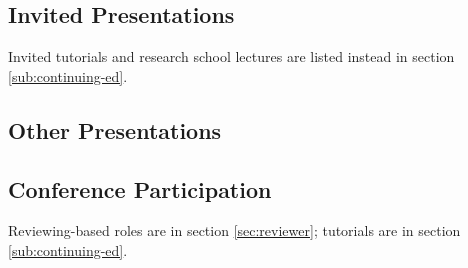 \documentclass[10pt]{article}
\begin{document}
%

\subsection{Invited Presentations} %

Invited tutorials and research school lectures are listed instead in section \ref{sub:continuing-ed}.
{\color{white} \competitive\international\national\local\virtual\paid}

\begin{itemize}[leftmargin=5em]

\end{itemize}


\subsection{Other Presentations}

\begin{itemize}[leftmargin=5em]

\end{itemize}


%

\subsection{Conference Participation} %
\label{sec:conference-participation}

Reviewing-based roles are in section \ref{sec:reviewer}; tutorials are in section \ref{sub:continuing-ed}.
\end{document}
